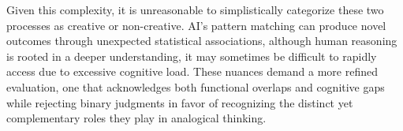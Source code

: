 Given this complexity, it is unreasonable to simplistically categorize these two processes as creative or non-creative. AI's pattern matching can produce novel outcomes through unexpected statistical associations, although human reasoning is rooted in a deeper understanding, it may sometimes be difficult to rapidly access due to excessive cognitive load\cite{richland2013reducing, lu2023differences}. These nuances demand a more refined evaluation, one that acknowledges both functional overlaps and cognitive gaps while rejecting binary judgments in favor of recognizing the distinct yet complementary roles they play in analogical thinking.





